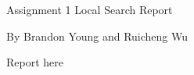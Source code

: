 \documentclass[12pt, letterpaper]{article}
\begin{document}
Assignment 1 Local Search Report

By Brandon Young and Ruicheng Wu

\bigskip

Report here
\end{document}
